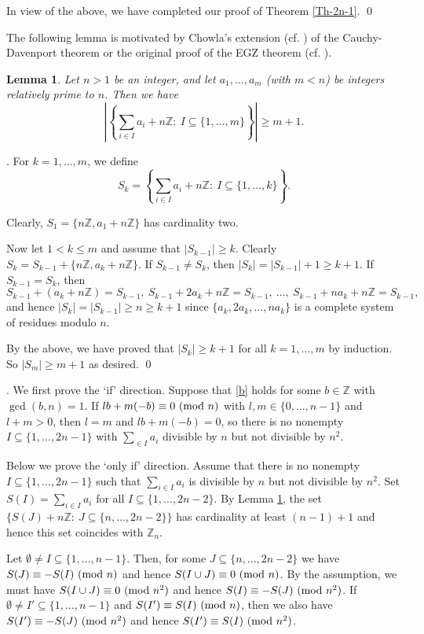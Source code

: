 \documentclass[11pt,reqno]{amsart}
\def\pmod #1{\ ({\rm{mod}}\ #1)}
\def\Z{\mathbb Z}
\def\l{\left}
\def\r{\right}
\def\ls{\leqslant}
\def\gs{\geqslant}
\def\se {\subseteq}
\def\eq{\equiv}
\def\Proof{\noindent{\it Proof}}
\theoremstyle{plain}
\newtheorem{lemma}{Lemma}
\theoremstyle{definition}
\theoremstyle{remark}
\begin{document}
In view of the above, we have completed our proof of Theorem \ref{Th-2n-1}. \qed



The following lemma is motivated by Chowla's extension (cf. \cite[pp.\,43-44]{N96}) of the Cauchy-Davenport theorem
or the original proof of the EGZ theorem (cf. \cite{EGZ}).

\begin{lemma} \label{Lem-n} Let $n>1$ be an integer, and let $a_1,\ldots,a_{m}$ (with $m<n$)
be integers relatively prime to $n$. Then we have
$$\l|\l\{\sum_{i\in I}a_i+n\Z:\ I\se\{1,\ldots,m\}\r\}\r|\gs m+1.$$
\end{lemma}
\Proof. For $k=1,\ldots,m$, we define
$$S_k=\l\{\sum_{i\in I}a_i+n\Z:\ I\se\{1,\ldots,k\}\r\}.$$

Clearly, $S_1=\{n\Z,a_1+n\Z\}$ has cardinality two.

Now let $1<k\ls m$ and assume that $|S_{k-1}|\gs k$. Clearly $S_k=S_{k-1}+\{n\Z,a_k+n\Z\}$.
If $S_{k-1}\not=S_k$, then $|S_k|=|S_{k-1}|+1\gs k+1$.
If $S_{k-1}=S_k$, then
$$S_{k-1}+(a_k+n\Z)=S_{k-1}, \ S_{k-1}+2a_k+n\Z=S_{k-1},\ \ldots,\ S_{k-1}+na_k+n\Z=S_{k-1},$$
and hence $|S_k|=|S_{k-1}|\gs n\gs k+1$ since $\{a_k,2a_k,\ldots,na_k\}$
is a complete system of residues modulo $n$.

By the above, we have proved that $|S_k|\gs k+1$ for all $k=1,\ldots,m$ by induction.
So $|S_{m}|\gs m+1$ as desired. \qed

\medskip
{}.
We first prove the `if' direction. Suppose that \eqref{b} holds for some $b\in\Z$
with $\gcd(b,n)=1$. If $lb+m(-b)\eq0\pmod n$ with $l,m\in\{0,\ldots,n-1\}$ and $l+m>0$, then
$l=m$ and $lb+m(-b)=0$, so there is no nonempty $I\se\{1,\ldots,2n-1\}$ with $\sum_{\in I}a_i$
divisible by $n$ but not divisible by $n^2$.

 Below we prove the `only if' direction. Assume that there is no nonempty $I\se\{1,\ldots,2n-1\}$ such that $\sum_{i\in I}a_i$
is divisible by $n$ but not divisible by $n^2$.
Set $S(I)=\sum_{i\in I}a_i$ for all $I\se\{1,\ldots,2n-2\}$.
By Lemma \ref{Lem-n},  the set $\{S(J)+n\Z:\ J\se\{n,\ldots,2n-2\}\}$
has cardinality at least $(n-1)+1$ and hence this set coincides with $\Z_n$.

Let $\emptyset\not=I\se\{1,\ldots,n-1\}$. Then, for some $J\se\{n,\ldots,2n-2\}$ we have
$S(J)\eq-S(I)\pmod n$ and hence $S(I\cup J)\eq0\pmod n$. By the assumption, we must have
$S(I\cup J)\eq0\pmod{n^2}$ and hence $S(I)\eq-S(J)\pmod{n^2}$.
If $\emptyset\not=I'\se\{1,\ldots,n-1\}$ and $S(I')\eq S(I)\pmod n$, then we also have
$S(I')\eq- S(J)\pmod{n^2}$ and hence $S(I')\eq S(I)\pmod {n^2}$.
\end{document}
